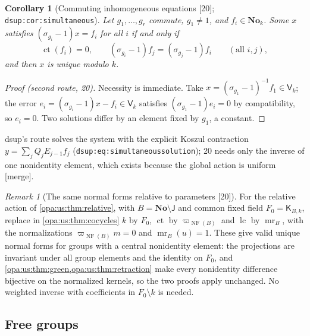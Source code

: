 \documentclass[11pt,oneside]{article}
\numberwithin{equation}{section}
\newtheorem{corollary}[corollary]{Corollary}
\theoremstyle{definition}
\theoremstyle{remark}
\newtheorem{remark}[remark]{Remark}
\newcommand{\No}{\mathbf{No}}
\newcommand{\lc}{\operatorname{lc}}
\newcommand{\ct}{\operatorname{ct}}
\newcommand{\src}[1]{\textup{\textsf{\small[#1]}}}
\newcommand{\mergetag}{\textup{\textsf{\small[merge]}}}
\newcommand{\lbl}[1]{\nolinkurl{#1}}
\newcommand{\NF}{\operatorname{NF}}
\begin{document}
\begin{corollary}[Commuting inhomogeneous equations \src{20}; \lbl{dsup:cor:simultaneous}]\label{opa:us:cor:compatible}
Let $g_1,\dots,g_r$ commute, $g_1\ne1$, and $f_i\in\No_k$. Some $x$ satisfies $(\sigma_{g_i}-1)x=f_i$ for all $i$ if and only if
\begin{equation}\label{opa:us:eq:compatibility}
 \ct(f_i)=0,\qquad (\sigma_{g_i}-1)f_j=(\sigma_{g_j}-1)f_i\qquad(\text{all }i,j),
\end{equation}
and then $x$ is unique modulo $k$.
\end{corollary}
\begin{proof}[Proof \textup{(second route, 20)}]
Necessity is immediate. Take $x=(\sigma_{g_1}-1)^{-1}f_1\in\mathsf V_k$; the error $e_i=(\sigma_{g_i}-1)x-f_i\in\mathsf V_k$ satisfies $(\sigma_{g_1}-1)e_i=0$ by compatibility,
so $e_i=0$. Two solutions differ by an element fixed by $g_1$, a constant.
\end{proof}

dsup's route solves the system with the explicit Koszul contraction $y=\sum_jQ_jE_{j-1}f_j$ (\lbl{dsup:eq:simultaneoussolution}); 20 needs only the
inverse of one nonidentity element, which exists because the global action is uniform \mergetag.

\begin{remark}[The same normal forms relative to parameters \src{20}]\label{opa:us:rem:relcocycles}
For the relative action of \cref{opa:us:thm:relative}, with $B=\No\setminus\mathsf J$ and common fixed field $F_0=\mathsf K_{B,k}$, replace in
\cref{opa:us:thm:cocycles} $k$ by $F_0$, $\ct$ by $\varpi_{\NF(B)}$ and $\lc$ by $\operatorname{mr}_B$, with the normalizations $\varpi_{\NF(B)}m=0$ and
$\operatorname{mr}_B(u)=1$. These give valid unique normal forms for groups with a central nonidentity element: the projections are invariant under all
group elements and the identity on $F_0$, and \cref{opa:us:thm:green,opa:us:thm:retraction} make every nonidentity difference bijective on the
normalized kernels, so the two proofs apply unchanged. No weighted inverse with coefficients in $F_0\setminus k$ is needed.
\end{remark}

\subsection{Free groups}
\end{document}
